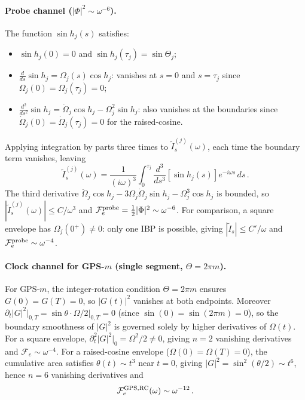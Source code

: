 \documentclass[aps,pra,twocolumn,superscriptaddress,longbibliography]{revtex4-2}
\newcommand{\be}{\begin{equation}}
\newcommand{\ee}{\end{equation}}
\begin{document}
       \paragraph{Probe channel ($|\Phi|^2\sim\omega^{-6}$).}
       The function $\sin h_j(s)$ satisfies:
       \begin{itemize}
         \item $\sin h_j(0) = 0$ and $\sin h_j(\tau_j) = \sin\Theta_j$;
         \item $\tfrac{d}{ds}\sin h_j = \Omega_j(s)\cos h_j$:
               vanishes at $s=0$ and $s=\tau_j$ since $\Omega_j(0)=\Omega_j(\tau_j)=0$;
         \item $\tfrac{d^2}{ds^2}\sin h_j = \dot\Omega_j\cos h_j - \Omega_j^2\sin h_j$:
               also vanishes at the boundaries since $\dot\Omega_j(0)=\dot\Omega_j(\tau_j)=0$      
               for the raised-cosine.
       \end{itemize}
       Applying integration by parts three times to $\tilde{I}_s^{(j)}(\omega)$, each time the     
       boundary term vanishes, leaving
       \be
         \tilde{I}_s^{(j)}(\omega) = \frac{1}{(i\omega)^3}\int_0^{\tau_j}
           \frac{d^3}{ds^3}\!\left[\sin h_j(s)\right]e^{-i\omega s}\,ds\,.
       \ee
       The third derivative $\ddot\Omega_j\cos h_j - 3\Omega_j\dot\Omega_j\sin h_j -
       \Omega_j^3\cos h_j$
       is bounded, so $|\tilde{I}_s^{(j)}(\omega)|\leq C/\omega^3$
       and $\mathcal{F}_e^{\rm probe}=\tfrac{1}{2}|\Phi|^2\sim\omega^{-6}$.
       For comparison, a square envelope has $\Omega_j(0^+)\neq 0$: only one IBP is possible,      
       giving $|\tilde{I}_s|\leq C'/\omega$ and $\mathcal{F}_e^{\rm probe}\sim\omega^{-4}$.        

       \paragraph{Clock channel for GPS-$m$ (single segment, $\Theta=2\pi m$).}
       For GPS-$m$, the integer-rotation condition $\Theta=2\pi m$ ensures
       $G(0)=G(T)=0$, so $|G(t)|^2$ vanishes at both endpoints.
       Moreover $\partial_t|G|^2\big|_{0,T}=\sin\theta\cdot\Omega/2\big|_{0,T}=0$
       (since $\sin(0)=\sin(2\pi m)=0$), so the boundary smoothness of $|G|^2$
       is governed solely by higher derivatives of $\Omega(t)$.
       For a square envelope, $\partial_t^2|G|^2\big|_0 = \Omega^2/2\neq 0$,
       giving $n=2$ vanishing derivatives and $\mathcal{F}_e\sim\omega^{-4}$.
       For a raised-cosine envelope ($\Omega(0)=\Omega(T)=0$), the cumulative area
       satisfies $\theta(t)\sim t^3$ near $t=0$, giving $|G|^2=\sin^2(\theta/2)\sim t^6$,
       hence $n=6$ vanishing derivatives and
       \be
         \mathcal{F}_e^{\rm GPS,RC}(\omega)\sim\omega^{-12}\,.
       \ee
\end{document}
